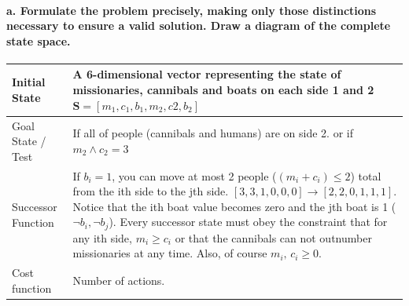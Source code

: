 \documentclass[12pt]{article}
\begin{document}
\paragraph{a. Formulate the problem precisely, making only those distinctions necessary to ensure a
valid solution. Draw a diagram of the complete state space.}
\begin{center}
    \begin{tabular}{| l | p{10cm} |}
    \hline
	Initial State & A 6-dimensional vector representing the state of missionaries, cannibals and boats on each side 1 and 2 
	$\textbf{S} = [m_1, c_1, b_1, m_2, c2, b_2]$\\
	\hline
	Goal State / Test & If all of people (cannibals and humans) are on side 2. or if $m_2 \wedge c_2 = 3$\\
	\hline
	Successor Function & If $b_i = 1$, you can move at most 2 people ($(m_i + c_i) \leq 2$) total from the ith side to the jth side.
	$[3,3,1,0,0,0] \rightarrow [2,2,0,1,1,1]$. 
	Notice that the ith boat value becomes zero and the jth boat is 1 ($\neg b_i , \neg b_j$). Every successor state 
	must obey the constraint that for any ith side, $m_i \geq c_i$ or that the cannibals can not outnumber missionaries at any time. Also, of course $m_i,\,c_i \geq 0$.\\
	\hline
	Cost function & Number of actions.\\
	\hline
    \end{tabular}
\end{center}
\end{document}
